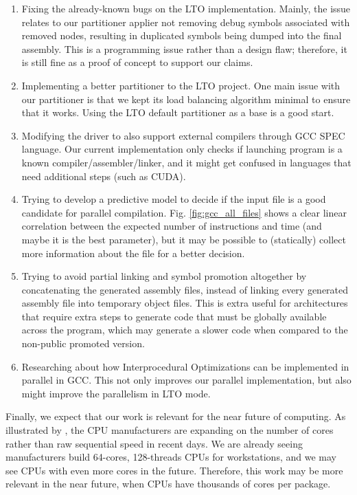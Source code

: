 \begin{enumerate}

\item Fixing the already-known bugs on the LTO implementation.
Mainly, the issue relates to our partitioner applier not removing debug symbols
associated with removed nodes, resulting in duplicated symbols being dumped
into the final assembly. This is a programming issue rather than a design flaw;
therefore, it is still fine as a proof of concept to support our claims.

\item Implementing a better partitioner to the LTO project. One main issue
with our partitioner is that we kept its load balancing algorithm minimal to
ensure that it works. Using the LTO default partitioner as a base is a good start.

\item Modifying the driver to also support external compilers through GCC
SPEC language. Our current implementation only checks if launching program
is a known compiler/assembler/linker, and it might get confused in languages that
need additional steps (such as CUDA).

\item Trying to develop a predictive model to decide if the input file is
a good candidate for parallel compilation. Fig. \ref{fig:gcc_all_files} shows
a clear linear correlation between the expected number of instructions and time
(and maybe it is the best parameter), but it may be possible to (statically)
collect more information about the file for a better decision.

\item Trying to avoid partial linking and symbol promotion altogether by
concatenating the generated assembly files, instead of linking every generated
assembly file into temporary object files. This is extra useful for
architectures that require extra steps to generate code that must be globally
available across the program, which may generate a slower code when compared to
the non-public promoted version.

\item Researching about how Interprocedural Optimizations can be implemented
in parallel in GCC. This not only improves our parallel implementation,
but also might improve the parallelism in LTO mode.

\end{enumerate}

Finally, we expect that our work is relevant for the near future of computing.
As illustrated by \cite{42years}, the CPU manufacturers are expanding on the
number of cores rather than raw sequential speed in recent days. We are already
seeing manufacturers build 64-cores, 128-threads CPUs for workstations, and we
may see CPUs with even more cores in the future. Therefore, this work may be
more relevant in the near future, when CPUs have thousands of cores per package.
